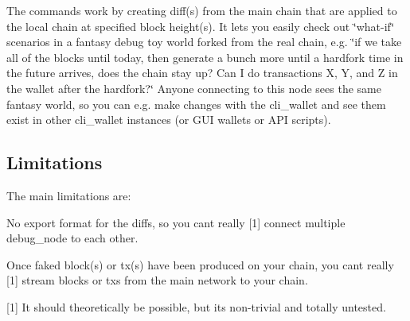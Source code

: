 The commands work by creating diff(s) from the main chain that are applied to the local chain at specified block height(s). It lets you easily check out \char`\"{}what-\/if\char`\"{} scenarios in a fantasy debug toy world forked from the real chain, e.\+g. \char`\"{}if we take all of the blocks until today, then generate a bunch more until a hardfork time
in the future arrives, does the chain stay up?  Can I do transactions X, Y, and Z in the wallet after the hardfork?\char`\"{} Anyone connecting to this node sees the same fantasy world, so you can e.\+g. make changes with the {\ttfamily cli\+\_\+wallet} and see them exist in other {\ttfamily cli\+\_\+wallet} instances (or G\+UI wallets or A\+PI scripts).

\subsection*{Limitations }

The main limitations are\+:


\begin{DoxyItemize}
\item No export format for the diffs, so you can\textquotesingle{}t really \mbox{[}1\mbox{]} connect multiple {\ttfamily debug\+\_\+node} to each other.
\item Once faked block(s) or tx(s) have been produced on your chain, you can\textquotesingle{}t really \mbox{[}1\mbox{]} stream blocks or tx\textquotesingle{}s from the main network to your chain.
\end{DoxyItemize}

\mbox{[}1\mbox{]} It should theoretically be possible, but it\textquotesingle{}s non-\/trivial and totally untested. 